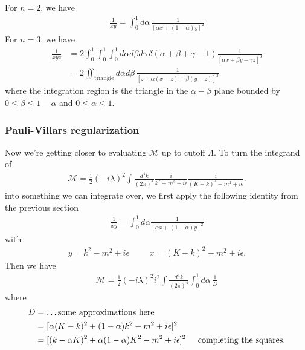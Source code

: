 \documentclass{book}
\theoremstyle{definition}
\newcommand{\f}[2]{\frac{#1}{#2}}
\begin{document}
For $n=2$, we have
\begin{align}
{\f{1}{xy} = \int^1_0 d\alpha \, \f{1}{[\alpha x +(1-\alpha)y]^2}}
\end{align}
For $n=3$, we have
\begin{align}
\f{1}{xyz} &= 2\int^1_0 \int^1_0 \int^1_0 d\alpha d\beta d\gamma\, \delta(\alpha + \beta + \gamma - 1) \f{1}{[\alpha x + \beta y + \gamma z]^3} \nonumber\\
&= 2\iint_{\text{triangle}} d\alpha d\beta\, \f{1}{[z + \alpha(x-z) + \beta(y -z)]^3}
\end{align}
where the integration region is the triangle in the $\alpha-\beta$ plane bounded by $0 \leq \beta \leq 1 - \alpha$ and $0 \leq \alpha \leq 1$. 
















\subsubsection{Pauli-Villars regularization}

Now we're getting closer to evaluating $\mathcal{M}$ up to cutoff $\Lambda$. To turn the integrand of
\begin{align}
\mathcal{M} = \f{1}{2}(-i\lambda)^2\int \f{d^4k}{(2\pi)^4}\f{i}{k^2 - m^2 + i\epsilon}\f{i}{(K - k)^2 - m^2 + i\epsilon}.
\end{align}
into something we can integrate over, we first apply the following identity from the previous section
\begin{align}
\f{1}{xy} = \int^1_0 d\alpha \f{1}{[\alpha x + (1-\alpha )y]^2}
\end{align}
with 
\begin{align}
y = k^2 - m^2 + i\epsilon \hspace{1cm} x = (K - k)^2 - m^2 + i\epsilon.
\end{align}
Then we have
\begin{align}
\mathcal{M} = \f{1}{2}(-i\lambda)^2 i^2 \int \f{d^4k}{(2\pi)^4}\int^1_0 d\alpha\, \f{1}{D}
\end{align}
where
\begin{align}
D &=  \dots \nonumber \text{some approximations here}\\
& =[\alpha(K-k)^2 + (1-\alpha)k^2 - m^2 + i\epsilon]^2 \nonumber\\
&= [(k - \alpha K)^2 + \alpha(1-\alpha)K^2- m^2   + i\epsilon]^2 \nonumber \hspace{0.5cm}\text{completing the squares}.
\end{align}
\end{document}
